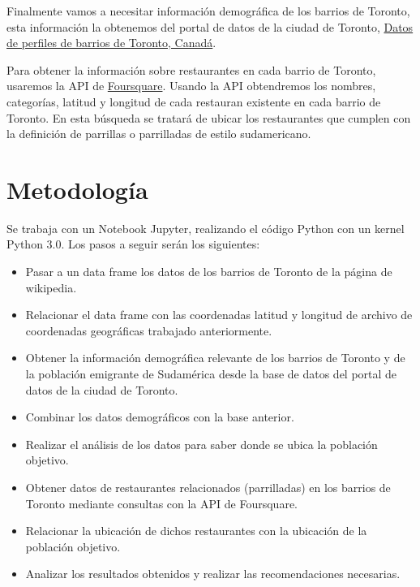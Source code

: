 \documentclass[10pt,a4paper,arial, spanish]{article}
\begin{document}
Finalmente vamos a necesitar información demográfica de los barrios de Toronto, esta información la obtenemos del portal de datos de la ciudad de Toronto, {\href{https://open.toronto.ca/dataset/neighbourhood-profiles/}{Datos de perfiles de barrios de Toronto, Canadá}}.

Para obtener la información sobre restaurantes en cada barrio de Toronto, usaremos la API de  {\href{https://developer.foursquare.com/docs}{Foursquare}}. Usando la API obtendremos los nombres, categorías, latitud y longitud de cada restauran existente en cada barrio de Toronto. En esta búsqueda se tratará de ubicar los restaurantes que cumplen con la definición de parrillas o parrilladas de estilo sudamericano.   

\section{Metodología}
Se trabaja con un Notebook Jupyter, realizando el código Python con un kernel Python 3.0.
Los pasos a seguir serán los siguientes:
\begin{itemize}
	\item Pasar a un data frame los datos de los barrios de Toronto de la página de wikipedia.
	\item Relacionar el data frame con las coordenadas latitud y longitud de archivo de coordenadas geográficas trabajado anteriormente.
	\item Obtener la información demográfica relevante de los barrios de Toronto y de la población emigrante de Sudamérica  desde  la base de datos del portal de datos de la ciudad de Toronto.
	\item Combinar los datos demográficos con la base anterior.
	\item Realizar el análisis de los datos para saber donde se ubica la población objetivo.
	\item Obtener datos de restaurantes relacionados (parrilladas) en los barrios de Toronto mediante consultas con la API de Foursquare.
	\item Relacionar la ubicación de dichos restaurantes con la ubicación de la población objetivo.
	\item Analizar los resultados obtenidos y realizar las recomendaciones necesarias.   
\end{itemize}
\end{document}
